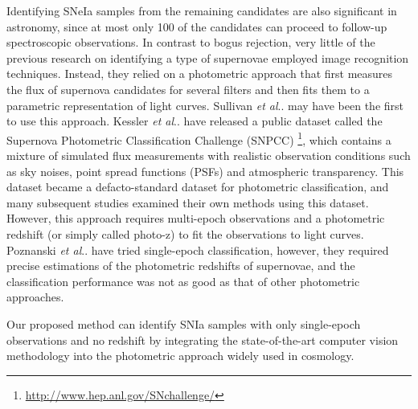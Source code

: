 \documentclass[conference,compsoc]{IEEEtran}
\makeatletter
\DeclareRobustCommand\onedot{\futurelet\@let@token\@onedot}
\def\@onedot{\ifx\@let@token.\else.\null\fi\xspace}
\def\etal{\emph{et al}\onedot}
\makeatother
\begin{document}
  Identifying SNeIa samples from the remaining candidates are also significant in astronomy, since at most only 100 of the candidates can proceed to follow-up spectroscopic observations.
  In contrast to bogus rejection, very little of the previous research on identifying a type of supernovae employed image recognition techniques.
  Instead, they relied on a photometric approach that first measures the flux of supernova candidates for several filters and then fits them to a parametric representation of light curves.
  Sullivan \etal \cite{Sullivan2006} may have been the first to use this approach. %
  Kessler \etal \cite{Kessler2010a} have released a public dataset called the Supernova Photometric Classification Challenge (SNPCC) \footnote{\url{http://www.hep.anl.gov/SNchallenge/}}, which contains a mixture of simulated flux measurements with realistic observation conditions such as sky noises, point spread functions (PSFs) and atmospheric transparency.
  This dataset became a defacto-standard dataset for photometric classification, and many subsequent studies \cite{Richards2012,Karpenka2013,Lochner2016,Charnock2016} examined their own methods using this dataset.
  However, this approach requires multi-epoch observations and a photometric redshift (or simply called photo-z) to fit the observations to light curves.
  Poznanski \etal \cite{Poznanski2007} have tried single-epoch classification, however, they required precise estimations of the photometric redshifts of supernovae, and the classification performance was not as good as that of other photometric approaches.

  Our proposed method can identify SNIa samples with only single-epoch observations and no redshift by integrating the state-of-the-art computer vision methodology into the photometric approach widely used in cosmology.



\end{document}
